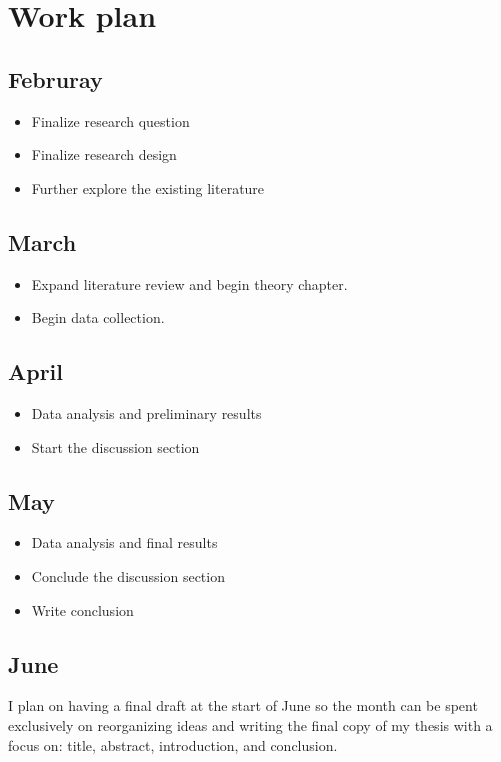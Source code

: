 \section{Work plan}

\subsection{Februray}
\begin{itemize}
  \item Finalize research question
  \item Finalize research design
  \item Further explore the existing literature
\end{itemize}

\subsection{March}
\begin{itemize}
  \item Expand literature review and begin theory chapter.
  \item Begin data collection.
\end{itemize}

\subsection{April}
\begin{itemize}
  \item Data analysis and preliminary results
  \item Start the discussion section
\end{itemize}

\subsection{May}
\begin{itemize}
  \item Data analysis and final results
  \item Conclude the discussion section
  \item Write conclusion
\end{itemize}

\subsection{June}
I plan on having a final draft at the start of June so the month can be spent exclusively
on reorganizing ideas and writing the final copy of my thesis with a focus on: title,
abstract, introduction, and conclusion.
